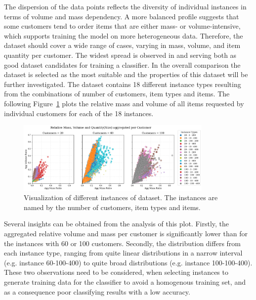 The dispersion of the data points reflects the diversity of individual instances in terms of volume
and mass dependency. A more balanced profile suggests that some customers tend to order items that
are either mass- or volume-intensive, which supports training the model on more heterogeneous data.
Therefore, the dataset should cover a wide range of cases, varying in mass, volume, and item
quantity per customer. The widest spread is observed in \krebsADataSetText and \gendreauDataSetText serving
both as good dataset candidates for training a classifier. In the overall comparison the \krebsADataSetText dataset
is selected as the most suitable and the properties of this dataset will be further investigated.
The dataset \krebsADataSetText contains 18 different instance types resulting from the combinations
of number of customers, item types and items. The following Figure~\ref{fig:krebs_dataset_analysis_detailes} plots
the relative mass and volume of all items requested by individual customers for each of the 18 instances.

\begin{figure}[ht]
    \centering
    \includegraphics[width=0.85\textwidth]{pictures/krebs_instances_detailed.png}
    \caption[Visualization of different instances of \textcite{krebs_advanced_2021} dataset.]{Visualization of different instances of \krebsADataSetText dataset.
        The instances are named by the number of customers, item types and items.}
    \label{fig:krebs_dataset_analysis_detailes}
\end{figure}

Several insights can be obtained from the analysis of this plot. Firstly, the aggregated relative
volume and mass per customer is significantly lower than for the instances with 60 or 100 customers. Secondly,
the distribution differs from each instance type, ranging from quite linear distributions in a narrow
interval (e.g. instance 60-100-400) to quite broad distributions (e.g. instance 100-100-400). These two observations need to be considered, when selecting
instances to generate training data for the classifier to avoid a homogenous training set, and
as a consequence poor classifying results with a low accuracy.




